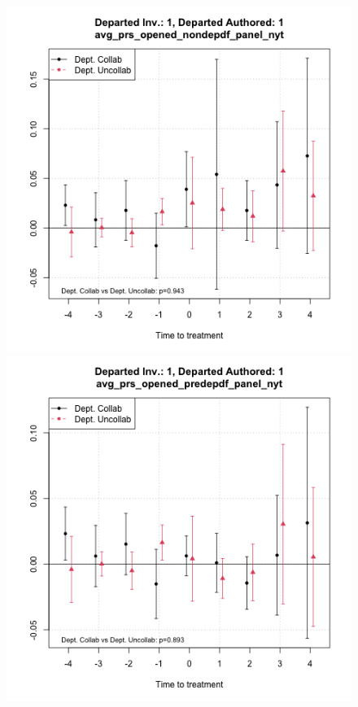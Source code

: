 \begin{figure}[htbp]
\begin{minipage}[b]{0.49\textwidth}
    \end{minipage}
    \hfill
    \begin{minipage}[b]{0.49\textwidth}
        \centering
        \includegraphics[width=\textwidth]{temp/output/collab_imp/auth_n1_inv_n1_cs_norm_avg_prs_opened_nondep.png}
    \end{minipage}
    \hfill
    \begin{minipage}[b]{0.49\textwidth}
        \centering
        \includegraphics[width=\textwidth]{temp/output/collab_imp/auth_n1_inv_n1_cs_norm_avg_prs_opened_predep.png}

\end{minipage}
\end{figure}
